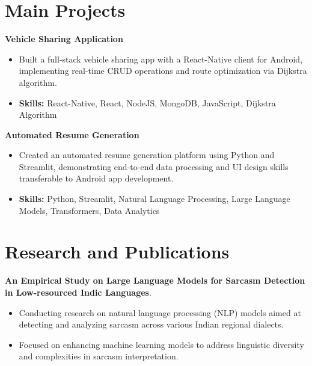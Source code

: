 \documentclass[a4paper,11pt]{article}
\begin{document}
\section{\textbf{Main Projects}}

\vspace{1mm}
  \textbf{Vehicle Sharing Application  }
\vspace{-1.5mm} %
\begin{itemize}
  \item Built a full-stack vehicle sharing app with a React-Native client for Android, implementing real-time CRUD operations and route optimization via Dijkstra algorithm.
\vspace{-3mm}
  \item \textbf{Skills:} React-Native, React, NodeJS, MongoDB, JavaScript, Dijkstra Algorithm
\end{itemize}


\vspace{1mm}
   \textbf{Automated Resume Generation }
\vspace{-1.5mm} %
\begin{itemize}
  \item Created an automated resume generation platform using Python and Streamlit, demonstrating end-to-end data processing and UI design skills transferable to Android app development.
\vspace{-3mm}
  \item \textbf{Skills:} Python, Streamlit, Natural Language Processing, Large Language Models, Transformers, Data Analytics
\end{itemize}



\section{\textbf{Research and Publications} \hfill }
\vspace{1mm}
  \textbf{An Empirical Study on Large Language Models for Sarcasm Detection in Low-resourced Indic Languages}.
\vspace{-1mm} %
\begin{itemize}
  \item Conducting research on natural language processing (NLP) models aimed at detecting and analyzing sarcasm across various Indian regional dialects.
\vspace{-3mm}
  \item Focused on enhancing machine learning models to address linguistic diversity and complexities in sarcasm interpretation.
\end{itemize}
\end{document}
